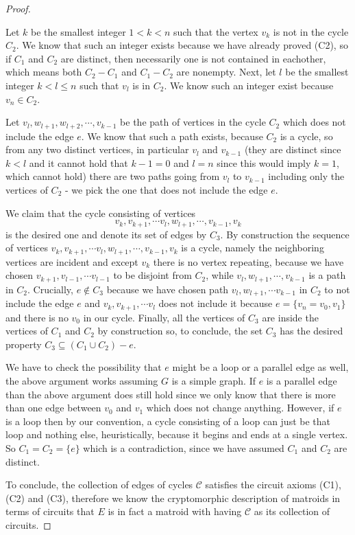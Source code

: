 \begin{proof}
\begin{enumerate}
    Let $k$ be the smallest integer $1<k< n$ such that the vertex $v_k$ is not in the cycle $C_2$. We know that such an integer exists because we have already proved (C2), so if $C_1$ and $C_2$ are distinct, then necessarily one is not contained in eachother, which means both $C_2 - C_1$ and $C_1 -C_2$ are nonempty.
    Next, let $l$ be the smallest integer $k <l \leq n$ such that $v_l$ is in $C_2$. We know such an integer exist because $v_n \in C_2$.
    
    Let $v_l, w_{l+1}, w_{l+2},  \cdots, v_{k-1}$ be the path of vertices in the cycle $C_2$ which does not include the edge $e$. We know that such a path exists, because $C_2$ is a cycle, so from any two distinct vertices, in particular $v_{l}$ and $v_{k-1}$ (they are distinct since $k<l$ and it cannot hold that $k-1 = 0$ and $l = n$ since this would imply $k = 1$, which cannot hold) there are two paths going from $v_{l}$ to $v_{k-1}$ including only the vertices of $C_2$ - we pick the one that does not include the edge $e$.
    
    We claim that the cycle consisting of vertices $$v_k, v_{k+1}, \cdots v_l, w_{l+1}, \cdots , v_{k-1}, v_k$$ is the desired one and denote its set of edges by $C_3$. By construction the sequence of vertices $v_k, v_{k+1}, \cdots v_l, w_{l+1}, \cdots , v_{k-1}, v_k$ is a cycle, namely the neighboring vertices are incident and except $v_k$ there is no vertex repeating, because we have chosen $v_{k+1}, v_{l-1}, \cdots v_{l-1}$ to be disjoint from $C_2$, while $v_l, w_{l+1}, \cdots, v_{k-1}$ is a path in $C_2$. Crucially, $e \notin C_3$ because we have chosen path $v_{l}, w_{l+1}, \cdots v_{k-1}$ in $C_2$ to not include the edge $e$ and $v_k, v_{k+1}, \cdots v_l$ does not include it because $e = \{v_n = v_0, v_1\}$ and there is no $v_0$ in our cycle. Finally, all the vertices of $C_3$ are inside the vertices of $C_1$ and $C_2$ by construction so, to conclude, the set $C_3$ has the desired property $C_3 \subseteq (C_1 \cup C_2) - e$.
    
    We have to check the possibility that $e$ might be a loop or a parallel edge as well, the above argument works assuming $G$ is a simple graph. If $e$ is a parallel edge than the above argument does still hold since we only know that there is more than one edge between $v_0$
    and $v_1$ which does not change anything. However, if $e$ is a loop then by our convention, a cycle consisting of a loop can just be that loop and nothing else, heuristically, because it begins and ends at a single vertex. So $C_1 = C_2 = \{e\}$ which is a contradiction, since we have assumed $C_1$ and $C_2$ are distinct.

\end{enumerate}

To conclude, the collection of edges of cycles $\mathcal{C}$ satisfies the circuit axioms (C1), (C2) and (C3), therefore we know the cryptomorphic description of matroids in terms of circuits that $E$ is in fact a matroid with having $\mathcal{C}$ as its collection of circuits.

\end{proof}


